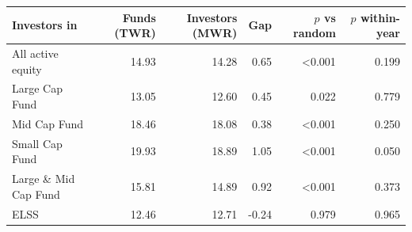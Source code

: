 \begin{tabular}{lrrrrr}
\toprule
Investors in & Funds (TWR) & Investors (MWR) & Gap & $p$ vs random & $p$ within-year \\
\midrule
All active equity & 14.93 & 14.28 & 0.65 & <0.001 & 0.199 \\
Large Cap Fund & 13.05 & 12.60 & 0.45 & 0.022 & 0.779 \\
Mid Cap Fund & 18.46 & 18.08 & 0.38 & <0.001 & 0.250 \\
Small Cap Fund & 19.93 & 18.89 & 1.05 & <0.001 & 0.050 \\
Large \& Mid Cap Fund & 15.81 & 14.89 & 0.92 & <0.001 & 0.373 \\
ELSS & 12.46 & 12.71 & -0.24 & 0.979 & 0.965 \\
\bottomrule
\end{tabular}
